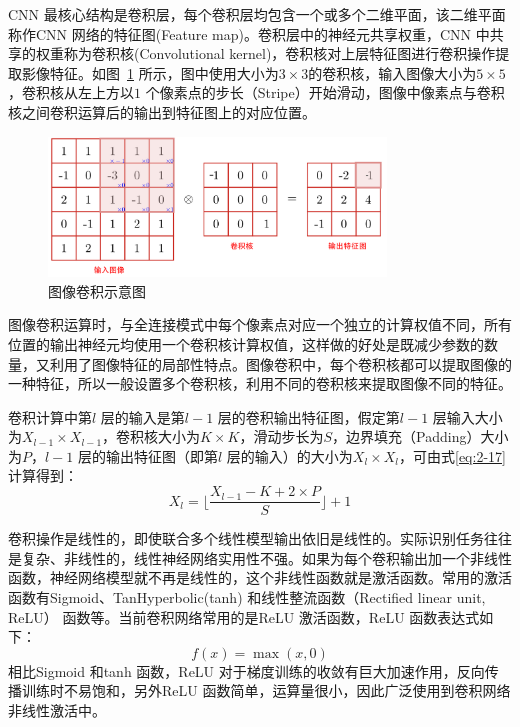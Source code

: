 CNN 最核心结构是卷积层，每个卷积层均包含一个或多个二维平面，该二维平面称作CNN 网络的特征图(Feature map)。卷积层中的神经元共享权重，CNN 中共享的权重称为卷积核(Convolutional kernel)，卷积核对上层特征图进行卷积操作提取影像特征。如图~\ref{fig:conv_op} 所示，图中使用大小为$3\times3$的卷积核，输入图像大小为$5\times5$，卷积核从左上方以$1$ 个像素点的步长（Stripe）开始滑动，图像中像素点与卷积核之间卷积运算后的输出到特征图上的对应位置。


\begin{figure}[htbp]
  \centering
  \includegraphics[width=0.8\textwidth]{figures/conv_op}
  \caption{图像卷积示意图}\label{fig:conv_op}
\end{figure}

图像卷积运算时，与全连接模式中每个像素点对应一个独立的计算权值不同，所有位置的输出神经元均使用一个卷积核计算权值，这样做的好处是既减少参数的数量，又利用了图像特征的局部性特点。图像卷积中，每个卷积核都可以提取图像的一种特征，所以一般设置多个卷积核，利用不同的卷积核来提取图像不同的特征。

卷积计算中第$l$ 层的输入是第$l-1$ 层的卷积输出特征图，假定第$l-1$ 层输入大小为$X_{l-1} \times X_{l-1}$，卷积核大小为$K \times K$，滑动步长为$S$，边界填充（Padding）大小为$P$，$l-1$ 层的输出特征图（即第$l$ 层的输入）的大小为$X_l \times X_l$，可由式\ref{eq:2-17} 计算得到：
\begin{equation}
  \label{eq:2-17}
  X_l = \lfloor \frac{X_{l-1} - K + 2 \times P}{S} \rfloor + 1
\end{equation}

卷积操作是线性的，即使联合多个线性模型输出依旧是线性的。实际识别任务往往是复杂、非线性的，线性神经网络实用性不强。如果为每个卷积输出加一个非线性函数，神经网络模型就不再是线性的，这个非线性函数就是激活函数。常用的激活函数有Sigmoid、TanHyperbolic(tanh) 和线性整流函数（Rectified linear unit, ReLU） 函数等。当前卷积网络常用的是ReLU 激活函数，ReLU 函数表达式如下：
\begin{equation}
  \label{eq:2-17-1}
  f(x) = \max(x,0)
\end{equation}
相比Sigmoid 和tanh 函数，ReLU 对于梯度训练的收敛有巨大加速作用，反向传播训练时不易饱和，另外ReLU 函数简单，运算量很小，因此广泛使用到卷积网络非线性激活中。

